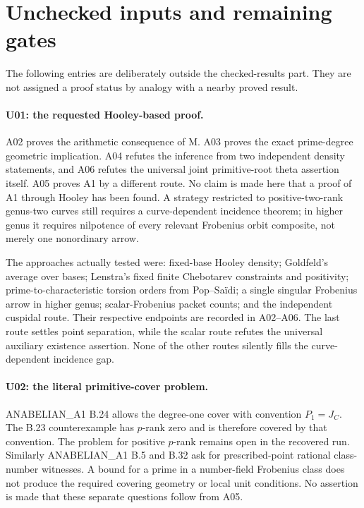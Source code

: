 \section{Unchecked inputs and remaining gates}
\label{sec:remaining}

The following entries are deliberately outside the checked-results
part. They are not assigned a proof status by analogy with a nearby
proved result.

\paragraph{U01: the requested Hooley-based proof.}
A02 proves the arithmetic consequence of M. A03 proves the exact
prime-degree geometric implication. A04 refutes the inference from
two independent density statements, and A06 refutes the universal
joint primitive-root theta assertion itself. A05 proves A1 by a
different route. No claim is made here that a proof of A1 through
Hooley has been found. A strategy restricted to positive-two-rank
genus-two curves still requires a curve-dependent incidence theorem;
in higher genus it requires nilpotence of every relevant Frobenius
orbit composite, not merely one nonordinary arrow.

The approaches actually tested were: fixed-base Hooley density;
Goldfeld's average over bases; Lenstra's fixed finite Chebotarev
constraints and positivity; prime-to-characteristic torsion orders
from Pop--Sa\"idi; a single singular Frobenius arrow in higher genus;
scalar-Frobenius packet counts; and the independent cuspidal route.
Their respective endpoints are recorded in A02--A06. The last route
settles point separation, while the scalar route refutes the
universal auxiliary existence assertion. None of the other routes
silently fills the curve-dependent incidence gap.

\paragraph{U02: the literal primitive-cover problem.}
ANABELIAN\_A1 B.24 allows the degree-one cover with convention
$P_1=J_C$. The B.23 counterexample has $p$-rank zero and is therefore
covered by that convention. The problem for positive $p$-rank
remains open in the recovered run. Similarly ANABELIAN\_A1 B.5 and
B.32 ask for prescribed-point rational class-number witnesses.
A bound for a prime in a number-field Frobenius class does not
produce the required covering geometry or local unit conditions.
No assertion is made that these separate questions follow from A05.

